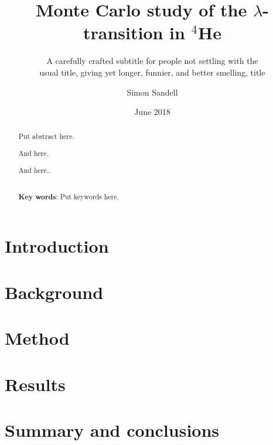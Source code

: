 \documentclass[nocoverpage,swedish,g5paper]{thesis}
\title{Monte Carlo study of the $\lambda$-transition in $^{4}$He}
\author{Simon Sandell}
\date{June 2018}
\subtitle{A carefully crafted subtitle for people not settling with the\\usual title, giving yet longer, funnier, and better smelling, title}
\newcommand{\todo}[1]{(\textbf{TODO:} #1)}
\begin{document}

\begin{abstract}
Put abstract here.

And here.

And here..
\\\noindent \strut \\
{\bf Key words}: Put keywords here.
\end{abstract}


\begin{preface}

\end{preface}

\tableofcontents

\mainmatter


\chapter{Introduction}


\chapter{Background}\label{ch:Background}


\chapter{Method}\label{ch:Method}


\chapter{Results}\label{ch:Results}


\chapter{Summary and conclusions}\label{ch:Summary}



%





%
\end{document}
